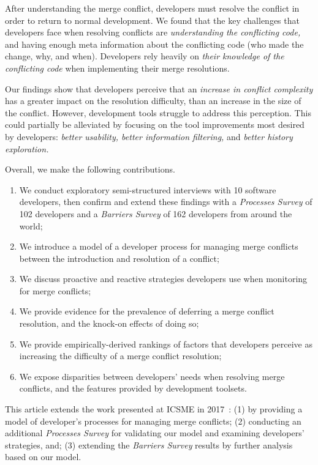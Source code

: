 After understanding the merge conflict, developers must resolve the conflict in order to return to normal development.
We found that the key challenges that developers face when resolving conflicts are \textit{understanding the conflicting code,} and having enough meta information about the conflicting code (who made the change, why, and when).
Developers rely heavily on \textit{their knowledge of the conflicting code} when implementing their merge resolutions.

Our findings show that developers perceive that an \textit{increase in conflict complexity} has a greater impact on the resolution difficulty, than an increase in the size of the conflict.
However, development tools struggle to address this perception.
This could partially be alleviated by focusing on the tool improvements most desired by developers: \textit{better usability, better information filtering,} and \textit{better history exploration.}


Overall, we make the following contributions.
\begin{enumerate}
\item We conduct exploratory semi-structured interviews with 10 software developers, then confirm and extend these findings with a \textit{Processes Survey} of 102 developers and a \textit{Barriers Survey} of 162 developers from around the world;
\item We introduce a model of a developer process for managing merge conflicts between the introduction and resolution of a conflict;
\item We discuss proactive and reactive strategies developers use when monitoring for merge conflicts;
\item We provide evidence for the prevalence of deferring a merge conflict resolution, and the knock-on effects of doing so;
\item We provide empirically-derived rankings of factors that developers perceive as increasing the difficulty of a merge conflict resolution;
\item We expose disparities between developers' needs when resolving merge conflicts, and the features provided by development toolsets.
\end{enumerate}

This article extends the work presented at ICSME in 2017~\cite{mckee2017software}: 
(1) by providing a model of developer's processes for managing merge conflicts; 
(2) conducting an additional \emph{Processes Survey} for validating our model and examining developers' strategies, and; 
(3) extending the \emph{Barriers Survey} results by further analysis based on our model. 